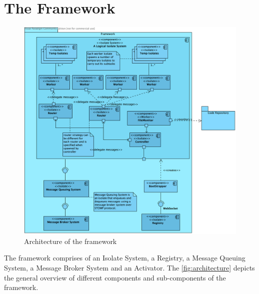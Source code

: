 \section{The Framework}
\begin{figure}[H]
  \centering
  \includegraphics[width=1\textwidth]{figures/componentDiagram}
  \caption[architecture]{Architecture of the framework}
  \label{fig:architecture}
\end{figure}


The framework comprises of an Isolate System, a Registry, a Message Queuing System, a Message Broker System and an Activator. The \autoref{fig:architecture} depicts the general overview of different components and sub-components of the framework.
